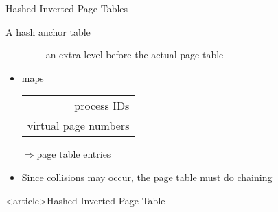\begin{frame}{Hashed Inverted Page Tables}
  \begin{description}
  \item[A hash anchor table] --- an extra level before the actual page table 
  \end{description}
  \begin{itemize}
  \item maps
    \begin{scriptsize}
      \begin{tabular}{r}
        process IDs\\
        virtual page numbers
      \end{tabular}
    \end{scriptsize}
    $\Rightarrow{}$page table entries
  \item Since collisions may occur, the page table must do chaining
  \end{itemize}
  \begin{center}
  \end{center}
\end{frame}

\begin{frame}<article>{Hashed Inverted Page Table}
  \begin{center}
  \end{center}
\end{frame}


